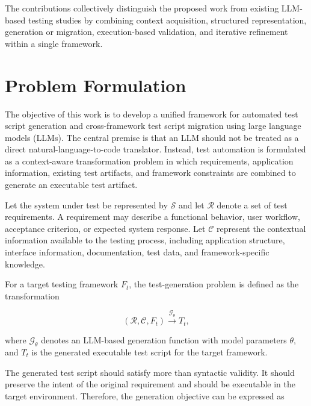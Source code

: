 \documentclass[pdflatex,sn-mathphys-num]{sn-jnl}
\begin{document}
The contributions collectively distinguish the proposed work from existing
LLM-based testing studies by combining context acquisition, structured
representation, generation or migration, execution-based validation, and
iterative refinement within a single framework.


\section{Problem Formulation}
\label{sec:problem}

The objective of this work is to develop a unified framework for automated
test script generation and cross-framework test script migration using large
language models (LLMs). The central premise is that an LLM should not be
treated as a direct natural-language-to-code translator. Instead, test
automation is formulated as a context-aware transformation problem in which
requirements, application information, existing test artifacts, and
framework constraints are combined to generate an executable test artifact.

Let the system under test be represented by $\mathcal{S}$ and let
$\mathcal{R}$ denote a set of test requirements. A requirement may describe
a functional behavior, user workflow, acceptance criterion, or expected
system response. Let $\mathcal{C}$ represent the contextual information
available to the testing process, including application structure,
interface information, documentation, test data, and framework-specific
knowledge.

For a target testing framework $F_t$, the test-generation problem is defined
as the transformation

\begin{equation}
    (\mathcal{R}, \mathcal{C}, F_t)
    \xrightarrow{\mathcal{G}_{\theta}}
    T_t ,
\label{eq:generation}
\end{equation}

where $\mathcal{G}_{\theta}$ denotes an LLM-based generation function with
model parameters $\theta$, and $T_t$ is the generated executable test script
for the target framework.

The generated test script should satisfy more than syntactic validity. It
should preserve the intent of the original requirement and should be
executable in the target environment. Therefore, the generation objective
can be expressed as
\end{document}
